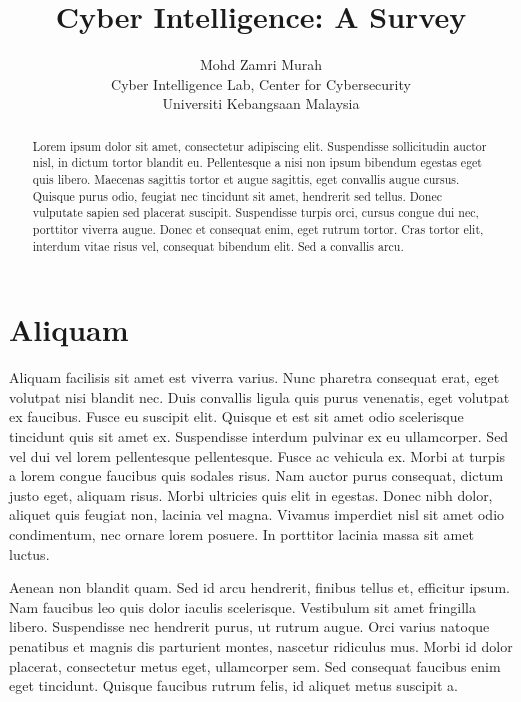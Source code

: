 \documentclass[12pt]{article} %
\title{Cyber Intelligence: A Survey}
\author{Mohd Zamri Murah\\
\small{Cyber Intelligence Lab, Center for Cybersecurity}\\
\small{Universiti Kebangsaan Malaysia}}
\date{} %
\begin{document}
\nocite{*}

\maketitle

\begin{abstract}
Lorem ipsum dolor sit amet, consectetur adipiscing elit. Suspendisse sollicitudin auctor nisl, in
dictum tortor blandit eu. Pellentesque a nisi non ipsum bibendum egestas eget quis libero. Maecenas
sagittis tortor et augue sagittis, eget convallis augue cursus. Quisque purus odio, feugiat nec
tincidunt sit amet, hendrerit sed tellus. Donec vulputate sapien sed placerat suscipit. Suspendisse
turpis orci, cursus congue dui nec, porttitor viverra augue. Donec et consequat enim, eget rutrum
tortor. Cras tortor elit, interdum vitae risus vel, consequat bibendum elit. Sed a convallis arcu.
\end{abstract}

\section{Aliquam}

Aliquam facilisis sit amet est viverra varius. Nunc pharetra consequat erat, eget volutpat nisi
blandit nec. Duis convallis ligula quis purus venenatis, eget volutpat ex faucibus. Fusce eu suscipit
elit. Quisque et est sit amet odio scelerisque tincidunt quis sit amet ex. Suspendisse interdum
pulvinar ex eu ullamcorper. Sed vel dui vel lorem pellentesque pellentesque. Fusce ac vehicula ex.
Morbi at turpis a lorem congue faucibus quis sodales risus. Nam auctor purus consequat, dictum justo
eget, aliquam risus. Morbi ultricies quis elit in egestas. Donec nibh dolor, aliquet quis feugiat non,
lacinia vel magna. Vivamus imperdiet nisl sit amet odio condimentum, nec ornare lorem posuere. In
porttitor lacinia massa sit amet luctus.

Aenean non blandit quam. Sed id arcu hendrerit, finibus tellus et, efficitur ipsum. Nam faucibus leo
quis dolor iaculis scelerisque. Vestibulum sit amet fringilla libero. Suspendisse nec hendrerit purus,
ut rutrum augue. Orci varius natoque penatibus et magnis dis parturient montes, nascetur ridiculus
mus. Morbi id dolor placerat, consectetur metus eget, ullamcorper sem. Sed consequat faucibus enim
eget tincidunt. Quisque faucibus rutrum felis, id aliquet metus suscipit a.
\end{document}
